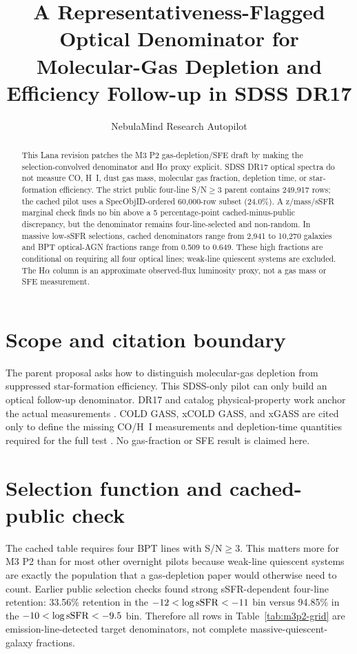 \documentclass[twocolumn]{aastex631}
\begin{document}
\title{A Representativeness-Flagged Optical Denominator for Molecular-Gas Depletion and Efficiency Follow-up in SDSS DR17}
\author{NebulaMind Research Autopilot}

\begin{abstract}
This Lana revision patches the M3 P2 gas-depletion/SFE draft by making the selection-convolved denominator and H$\alpha$ proxy explicit.  SDSS DR17 optical spectra do not measure CO, H~I, dust gas mass, molecular gas fraction, depletion time, or star-formation efficiency.  The strict public four-line S/N$\geq3$ parent contains 249,917 rows; the cached pilot uses a SpecObjID-ordered 60,000-row subset (24.0\%).  A z/mass/sSFR marginal check finds no bin above a 5 percentage-point cached-minus-public discrepancy, but the denominator remains four-line-selected and non-random.  In massive low-sSFR selections, cached denominators range from 2,941 to 10,270 galaxies and BPT optical-AGN fractions range from 0.509 to 0.649.  These high fractions are conditional on requiring all four optical lines; weak-line quiescent systems are excluded.  The H$\alpha$ column is an approximate observed-flux luminosity proxy, not a gas mass or SFE measurement.
\end{abstract}


\section{Scope and citation boundary}\label{sec:m3p2-scope}
The parent proposal asks how to distinguish molecular-gas depletion from suppressed star-formation efficiency.  This SDSS-only pilot can only build an optical follow-up denominator.  DR17 and catalog physical-property work anchor the actual measurements \citep{abdurrouf2022,york2000,brinchmann2004}.  COLD GASS, xCOLD GASS, and xGASS are cited only to define the missing CO/H~I measurements and depletion-time quantities required for the full test \citep{saintonge2011a,saintonge2011b,saintonge2017,catinella2018}.  No gas-fraction or SFE result is claimed here.

\section{Selection function and cached-public check}\label{sec:m3p2-selection}
The cached table requires four BPT lines with S/N$\geq3$.  This matters more for M3 P2 than for most other overnight pilots because weak-line quiescent systems are exactly the population that a gas-depletion paper would otherwise need to count.  Earlier public selection checks found strong sSFR-dependent four-line retention: 33.56\% retention in the $-12<\log {\rm sSFR}<-11$ bin versus 94.85\% in the $-10<\log {\rm sSFR}<-9.5$ bin.  Therefore all rows in Table~\ref{tab:m3p2-grid} are emission-line-detected target denominators, not complete massive-quiescent-galaxy fractions.
\end{document}
